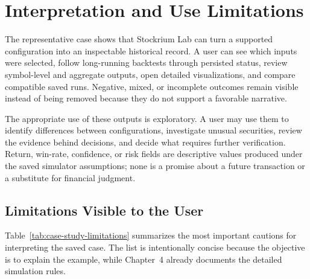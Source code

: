 \section{Interpretation and Use Limitations}
\label{sec:case-study-interpretation}

The representative case shows that Stockrium Lab can turn a supported configuration into an inspectable historical record. A user can see which inputs were selected, follow long-running backtests through persisted status, review symbol-level and aggregate outputs, open detailed visualizations, and compare compatible saved runs. Negative, mixed, or incomplete outcomes remain visible instead of being removed because they do not support a favorable narrative.

The appropriate use of these outputs is exploratory. A user may use them to identify differences between configurations, investigate unusual securities, review the evidence behind decisions, and decide what requires further verification. Return, win-rate, confidence, or risk fields are descriptive values produced under the saved simulator assumptions; none is a promise about a future transaction or a substitute for financial judgment.

\subsection{Limitations Visible to the User}
\label{subsec:case-study-limitations}

Table~\ref{tab:case-study-limitations} summarizes the most important cautions for interpreting the saved case. The list is intentionally concise because the objective is to explain the example, while Chapter~4 already documents the detailed simulation rules.

